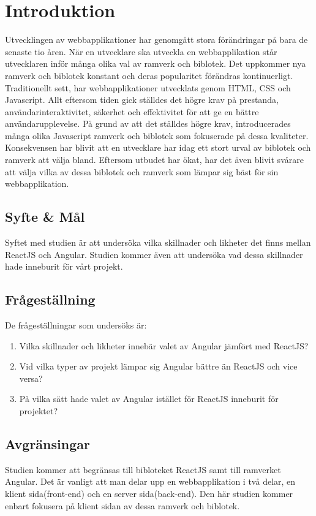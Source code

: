 \section{Introduktion}
\label{sec:axel-introduction}
Utvecklingen av webbapplikationer har genomgått stora förändringar på bara de senaste tio åren. När en utvecklare ska utveckla en webbapplikation står utvecklaren inför många olika val av ramverk och biblotek. Det uppkommer nya ramverk och biblotek konstant och deras popularitet förändras kontinuerligt. Traditionellt sett, har webbapplikationer utvecklats genom HTML, CSS och Javascript. Allt eftersom tiden gick ställdes det högre krav på prestanda, användarinteraktivitet, säkerhet och effektivitet för att ge en bättre användarupplevelse. På grund av att det ställdes högre krav, introducerades många olika Javascript ramverk och biblotek som fokuserade på dessa kvaliteter. Konsekvensen har blivit att en utvecklare har idag ett stort urval av biblotek och ramverk att välja bland. Eftersom utbudet har ökat, har det även blivit svårare att välja vilka av dessa biblotek och ramverk som lämpar sig bäst för sin webbapplikation.

\subsection{Syfte \& Mål}
\label{subsec:motivation}

Syftet med studien är att undersöka vilka skillnader och likheter det finns mellan ReactJS och Angular. Studien kommer även att undersöka vad dessa skillnader hade inneburit för vårt projekt. 

\subsection{Frågeställning}
\label{subsec:research-questions}

De frågeställningar som undersöks är:

\begin{enumerate}
\item Vilka skillnader och likheter innebär valet av Angular jämfört med ReactJS?

\item Vid vilka typer av projekt lämpar sig Angular bättre än ReactJS och vice versa?

\item På vilka sätt hade valet av Angular istället för ReactJS inneburit för projektet?


\end{enumerate}


\subsection{Avgränsingar}
\label{subsec:delimitations}
Studien kommer att begränsas till bibloteket ReactJS samt till ramverket Angular. Det är vanligt att man delar upp en webbapplikation i två delar, en klient sida(front-end) och en server sida(back-end). Den här studien kommer enbart fokusera på klient sidan av dessa ramverk och biblotek. 

